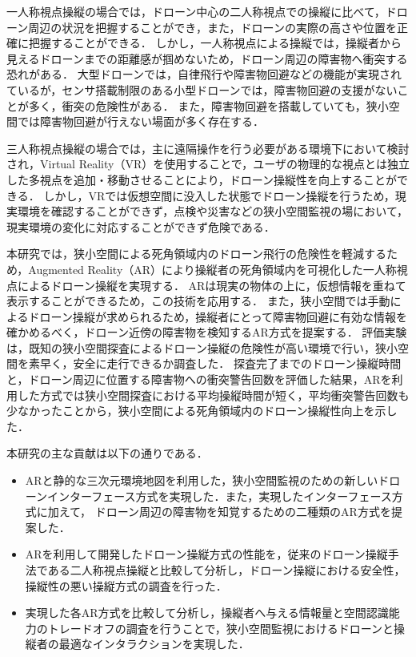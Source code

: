 \documentclass[submit]{ipsj}
\begin{document}
一人称視点操縦の場合では，ドローン中心の二人称視点での操縦に比べて，ドローン周辺の状況を把握することができ，また，ドローンの実際の高さや位置を正確に把握することができる\cite{book-drone02}．
しかし，一人称視点による操縦では，操縦者から見えるドローンまでの距離感が掴めないため\cite{article-ar01}\cite{article-ar02}，ドローン周辺の障害物へ衝突する恐れがある．
大型ドローンでは，自律飛行や障害物回避などの機能が実現されているが，センサ搭載制限のある小型ドローンでは，障害物回避の支援がないことが多く，衝突の危険性がある．
また，障害物回避を搭載していても，狭小空間では障害物回避が行えない場面が多く存在する\cite{article-drone12}．
\par
三人称視点操縦の場合では，主に遠隔操作を行う必要がある環境下において検討され，Virtual Reality（VR）を使用することで，ユーザの物理的な視点とは独立した多視点を追加・移動させることにより，ドローン操縦性を向上することができる\cite{book-drone04}．
しかし，VRでは仮想空間に没入した状態でドローン操縦を行うため\cite{article-drone13}，現実環境を確認することができず，点検や災害などの狭小空間監視の場において，現実環境の変化に対応することができず危険である．
\par
本研究では，狭小空間による死角領域内のドローン飛行の危険性を軽減するため，Augmented Reality（AR）により操縦者の死角領域内を可視化した一人称視点によるドローン操縦を実現する．
ARは現実の物体の上に，仮想情報を重ねて表示することができるため，この技術を応用する\cite{article-ar03}\cite{article-ar04}．
また，狭小空間では手動によるドローン操縦が求められるため，操縦者にとって障害物回避に有効な情報を確かめるべく，ドローン近傍の障害物を検知するAR方式を提案する．
評価実験は，既知の狭小空間探査によるドローン操縦の危険性が高い環境で行い，狭小空間を素早く，安全に走行できるか調査した．
探査完了までのドローン操縦時間と，ドローン周辺に位置する障害物への衝突警告回数を評価した結果，ARを利用した方式では狭小空間探査における平均操縦時間が短く，平均衝突警告回数も少なかったことから，狭小空間による死角領域内のドローン操縦性向上を示した．
\par
本研究の主な貢献は以下の通りである．
\begin{itemize}
  \item ARと静的な三次元環境地図を利用した，狭小空間監視のための新しいドローンインターフェース方式を実現した．また，実現したインターフェース方式\cite{article-ar05}に加えて，
  ドローン周辺の障害物を知覚するための二種類のAR方式を提案した．
  \item ARを利用して開発したドローン操縦方式の性能を，従来のドローン操縦手法である二人称視点操縦と比較して分析し，ドローン操縦における安全性，操縦性の悪い操縦方式の調査を行った．
  \item 実現した各AR方式を比較して分析し，操縦者へ与える情報量と空間認識能力のトレードオフの調査を行うことで，狭小空間監視におけるドローンと操縦者の最適なインタラクションを実現した．
\end{itemize}
\end{document}
